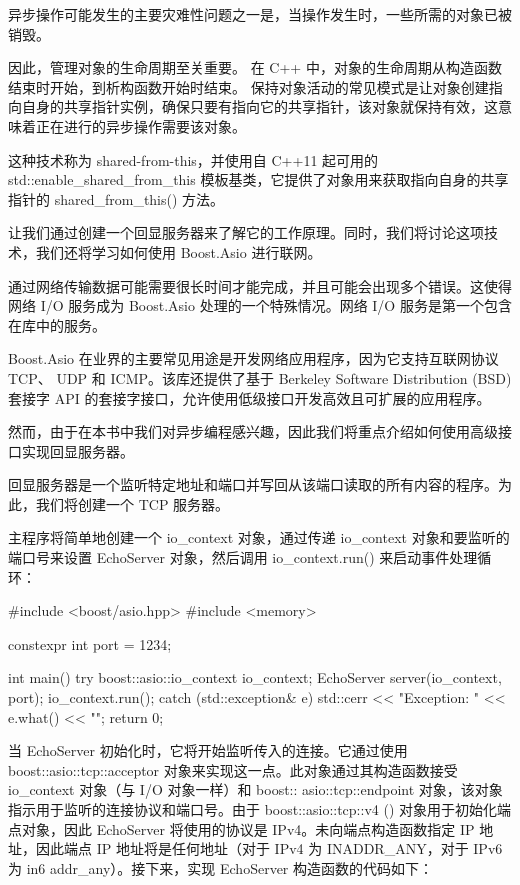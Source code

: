 
异步操作可能发生的主要灾难性问题之一是，当操作发生时，一些所需的对象已被销毁。

因此，管理对象的生命周期至关重要。
在 C++ 中，对象的生命周期从构造函数结束时开始，到析构函数开始时结束。
保持对象活动的常见模式是让对象创建指向自身的共享指针实例，确保只要有指向它的共享指针，该对象就保持有效，这意味着正在进行的异步操作需要该对象。

这种技术称为 shared-from-this，并使用自 C++11 起可用的 std::enable\_shared\_from\_this 模板基类，它提供了对象用来获取指向自身的共享指针的 shared\_from\_this() 方法。


让我们通过创建一个回显服务器来了解它的工作原理。同时，我们将讨论这项技术，我们还将学习如何使用 Boost.Asio 进行联网。

通过网络传输数据可能需要很长时间才能完成，并且可能会出现多个错误。这使得网络 I/O 服务成为 Boost.Asio 处理的一个特殊情况。网络 I/O 服务是第一个包含在库中的服务。

Boost.Asio 在业界的主要常见用途是开发网络应用程序，因为它支持互联网协议 TCP、 UDP 和 ICMP。该库还提供了基于 Berkeley Software Distribution (BSD) 套接字 API 的套接字接口，允许使用低级接口开发高效且可扩展的应用程序。

然而，由于在本书中我们对异步编程感兴趣，因此我们将重点介绍如何使用高级接口实现回显服务器。

回显服务器是一个监听特定地址和端口并写回从该端口读取的所有内容的程序。为此，我们将创建一个 TCP 服务器。

主程序将简单地创建一个 io\_context 对象，通过传递 io\_context 对象和要监听的端口号来设置 EchoServer 对象，然后调用 io\_context.run() 来启动事件处理循环：

\begin{cpp}
#include <boost/asio.hpp>
#include <memory>

constexpr int port = 1234;

int main() {
    try {
        boost::asio::io_context io_context;
        EchoServer server(io_context, port);
        io_context.run();
    } catch (std::exception& e) {
        std::cerr << "Exception: " << e.what() << "\n";
    }
    return 0;
}
\end{cpp}

当 EchoServer 初始化时，它将开始监听传入的连接。它通过使用 boost::asio::tcp::acceptor 对象来实现这一点。此对象通过其构造函数接受 io\_context 对象（与 I/O 对象一样）和 boost:: asio::tcp::endpoint 对象，该对象指示用于监听的连接协议和端口号。由于 boost::asio::tcp::v4 () 对象用于初始化端点对象，因此 EchoServer 将使用的协议是 IPv4。未向端点构造函数指定 IP 地址，因此端点 IP 地址将是任何地址（对于 IPv4 为 INADDR\_ANY，对于 IPv6 为 in6 addr\_any）。接下来，实现 EchoServer 构造函数的代码如下：

